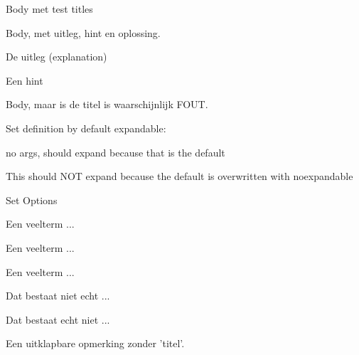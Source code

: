 \documentclass{ximera}
\begin{document}
\begin{definition}[Titel1, title={titel met toekenning aan 'title'}, noexpandable]
Body met test titles
\end{definition}


\begin{definition}
Body, met uitleg, hint en oplossing.
\begin{explanation} De uitleg (explanation) \end{explanation}
\begin{hint}        Een hint \end{hint}
\end{definition}

\begin{definition}[{Titel, met komma's, en, haakjes maar zonder title=}]
  Body, maar is de titel is waarschijnlijk FOUT. 
\end{definition}


Set definition by default expandable:

\begin{definition}[Veelterm]
   no args, should expand because that is the default
\end{definition}

\begin{definition}[title={Veelterm, with noexpandable option}, noexpandable]
   This should NOT expand because the default is overwritten with noexpandable
\end{definition}

Set Options
    

\begin{definition}[Veelterm]
   Een veelterm ...
\end{definition}

\begin{definition}[Veelterm]
   Een veelterm ...
\end{definition}

\begin{theorem}[Veelterm]
   Een veelterm ...
\end{theorem}




\begin{example}

    Dat bestaat niet echt ...
\end{example}

\begin{remark}

    Dat bestaat echt niet ...
\end{remark}

\begin{remark}[expandable]

    Een uitklapbare opmerking zonder 'titel'.
\end{remark}
\end{document}
